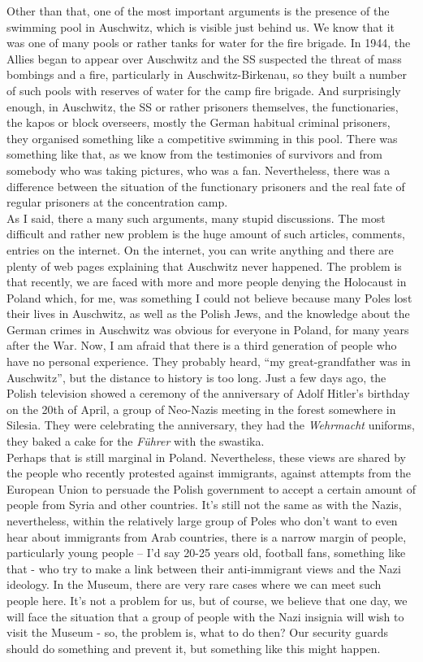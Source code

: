 Other than that, one of the most important arguments is the presence of the swimming pool in Auschwitz, which is visible just behind us. We know that it was one of many pools or rather tanks for water for the fire brigade. In 1944, the Allies began to appear over Auschwitz and the SS suspected the threat of mass bombings and a fire, particularly in Auschwitz-Birkenau, so they built a number of such pools with reserves of water for the camp fire brigade. And surprisingly enough, in Auschwitz, the SS or rather prisoners themselves, the functionaries, the kapos or block overseers, mostly the German habitual criminal prisoners, they organised something like a competitive swimming in this pool. There was something like that, as we know from the testimonies of survivors and from somebody who was taking pictures, who was a fan. Nevertheless, there was a difference between the situation of the functionary prisoners and the real fate of regular prisoners at the concentration camp. \\
As I said, there a many such arguments, many stupid discussions. The most difficult and rather new problem is the huge amount of such articles, comments, entries on the internet. On the internet, you can write anything and there are plenty of web pages explaining that Auschwitz never happened. The problem is that recently, we are faced with more and more people denying the Holocaust in Poland which, for me, was something I could not believe because many Poles lost their lives in Auschwitz, as well as the Polish Jews, and the knowledge about the German crimes in Auschwitz was obvious for everyone in Poland, for many years after the War. Now, I am afraid that there is a third generation of people who have no personal experience. They probably heard, ``my great-grandfather was in Auschwitz'', but the distance to history is too long. Just a few days ago, the Polish television showed a ceremony of the anniversary of Adolf Hitler's birthday on the 20th of April, a group of Neo-Nazis meeting in the forest somewhere in Silesia. They were celebrating the anniversary, they had the \textit{Wehrmacht} uniforms, they baked a cake for the \textit{Führer} with the swastika.\\ 
Perhaps that is still marginal in Poland. Nevertheless, these views are shared by the people who recently protested against immigrants, against attempts from the European Union to persuade the Polish government to accept a certain amount of people from Syria and other countries. It's still not the same as with the Nazis, nevertheless, within the relatively large group of Poles who don't want to even hear about immigrants from Arab countries, there is a narrow margin of people, particularly young people – I’d say 20-25 years old, football fans, something like that - who try to make a link between their anti-immigrant views and the Nazi ideology. In the Museum, there are very rare cases where we can meet such people here. It's not a problem for us, but of course, we believe that one day, we will face the situation that a group of people with the Nazi insignia will wish to visit the Museum - so, the problem is, what to do then? Our security guards should do something and prevent it, but something like this might happen.\\
